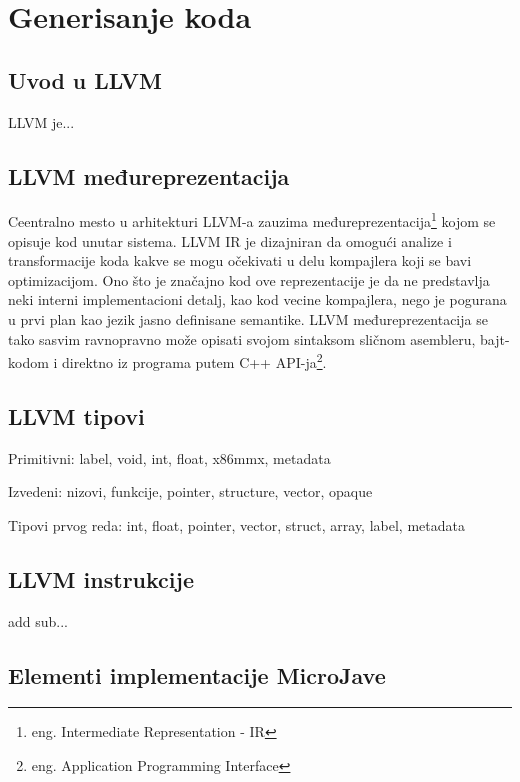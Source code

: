 \chapter{Generisanje koda}

\section{Uvod u LLVM}

LLVM je...

\section{LLVM međureprezentacija}

Ceentralno mesto u arhitekturi LLVM-a\cite{aosa} zauzima međureprezentacija\footnote{eng. Intermediate Representation - IR} kojom se opisuje kod unutar sistema. LLVM IR je dizajniran da omogući analize i transformacije koda kakve se mogu očekivati u delu kompajlera koji se bavi optimizacijom. Ono što je značajno kod ove reprezentacije je da ne predstavlja neki interni implementacioni detalj, kao kod vecine kompajlera, nego je pogurana u prvi plan kao jezik jasno definisane semantike. LLVM međureprezentacija se tako sasvim ravnopravno može opisati svojom sintaksom sličnom asembleru, bajt-kodom i direktno iz programa putem C++ API-ja\footnote{eng. Application Programming Interface}.

\section{LLVM tipovi}

Primitivni: label, void, int, float, x86mmx, metadata

Izvedeni: nizovi, funkcije, pointer, structure, vector, opaque

Tipovi prvog reda: int, float, pointer, vector, struct, array, label, metadata


\section{LLVM instrukcije}

add sub...

\section{Elementi implementacije MicroJave}

